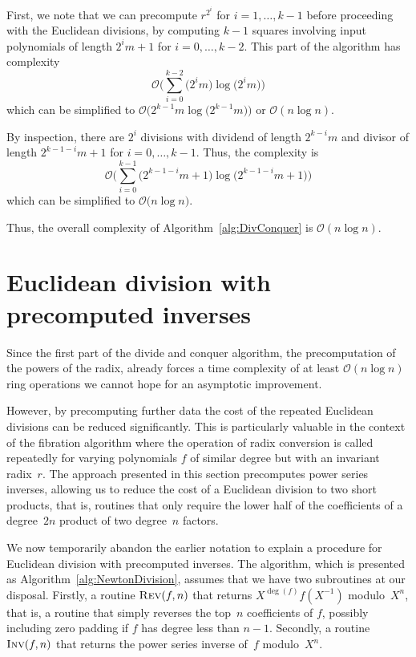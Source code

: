 First, we note that we can precompute $r^{2^i}$ for $i = 1, \dotsc, k-1$ 
before proceeding with the Euclidean divisions, by computing $k-1$ squares 
involving input polynomials of length $2^{i} m + 1$ for 
$i = 0, \dotsc, k-2$.  This part of the algorithm has complexity 
\begin{equation*}
\mathcal{O} \biggl( \sum_{i=0}^{k-2} \bigl(2^{i} m\bigr) \log \bigl(2^{i} m\bigr) \biggr)
\end{equation*}
which can be simplified to 
$\mathcal{O}\bigl(2^{k-1} m \log \bigl(2^{k-1} m\bigr) \bigr)$ 
or $\mathcal{O}(n \log n)$.

By inspection, there are $2^i$ divisions with dividend of length 
$2^{k-i} m$ and divisor of length $2^{k-1-i} m + 1$
for $i = 0, \dotsc, k-1$.  Thus, the complexity is 
\begin{equation*}
\mathcal{O} \biggl( \sum_{i=0}^{k-1} \bigl(2^{k-1-i} m + 1\bigr) 
    \log \bigl(2^{k-1-i} m + 1\bigr) \biggr)
\end{equation*}
which can be simplified to $\mathcal{O} \bigl( n \log n \bigr)$.

Thus, the overall complexity of Algorithm~\ref{alg:DivConquer} is 
$\mathcal{O}(n \log n)$.


\section{Euclidean division with precomputed inverses}

Since the first part of the divide and conquer algorithm, the 
precomputation of the powers of the radix, already forces a 
time complexity of at least $\mathcal{O} (n \log n)$ ring operations 
we cannot hope for an asymptotic improvement.

However, by precomputing further data the cost of the repeated 
Euclidean divisions can be reduced significantly.  This is 
particularly valuable in the context of the fibration algorithm 
where the operation of radix conversion is called repeatedly 
for varying polynomials $f$ of similar degree but with an invariant 
radix~$r$.  The approach presented in this section precomputes 
power series inverses, allowing us to reduce the cost of a 
Euclidean division to two short products, that is, routines
that only require the lower half of the coefficients of a degree~$2n$ 
product of two degree~$n$ factors.

We now temporarily abandon the earlier notation to explain 
a procedure for Euclidean division with precomputed inverses. 
The algorithm, which is presented as Algorithm~\ref{alg:NewtonDivision}, 
assumes that we have two subroutines at our disposal.  Firstly, 
a routine $\Call{Rev}{f,n}$ that returns $X^{\deg(f)} f(X^{-1})$ 
modulo~$X^n$, that is, a routine that simply reverses the top~$n$ 
coefficients of $f$, possibly including zero padding if $f$ has degree 
less than $n - 1$.  Secondly, a routine $\Call{Inv}{f,n}$ that returns 
the power series inverse of~$f$ modulo~$X^n$.

